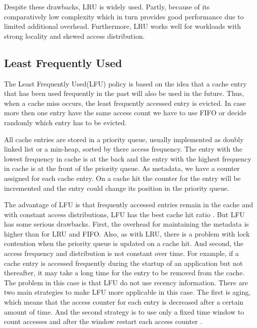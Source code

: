 \documentclass[
	12pt,
	a4paper,
	abstract,
	bibliography=totoc,
	chapterprefix,
	headings=openright,
	numbers=endperiod,
	parskip=half,
	twoside,
]{scrreprt}
\begin{document}
Despite these drawbacks, LRU is widely used.
Partly, because of its comparatively low complexity 
which in turn provides good performance due to limited additional overhead.
Furthermore, LRU works well for workloads with strong locality and skewed access distribution.

\subsection{Least Frequently Used}

The Least Frequently Used(LFU) policy is based on the idea that a cache entry that has been used frequently in the past will also be used in the future.
Thus, when a cache miss occurs, the least frequently accessed entry is evicted.
In case more then one entry have the same access count we have to use FIFO or decide randomly which entry has to be evicted.

All cache entries are stored in a priority queue, usually implemented as doubly linked list or a min-heap, sorted by there access frequency.
The entry with the lowest frequency in cache is at the back and the entry with the highest frequency in cache is at the front of the priority queue.
As metadata, we have a counter assigned for each cache entry.
On a cache hit the counter for the entry will be incremented and the entry could change its position in the priority queue.

The advantage of LFU is that frequently accessed entries remain in the cache and with constant
access distributions, LFU has the best cache hit ratio \cite{einziger2017tinylfu}.
But LFU has some  serious drawbacks.
First, the overhead for maintaining the metadata is higher than for LRU and FIFO.
Also, as with LRU, there is a problem with lock contention when the priority queue is updated on a cache hit.
And second, the access frequency and distribution is not constant over time.
For example, if a cache entry is accessed frequently during the startup of an application but not thereafter, it may take a long time for the 
entry to be removed from the cache.
The problem in this case is that LFU do not use recency information.
There are two main strategies to make LFU more applicable in this case.
The first is aging, which means that the access counter for each entry is decreased after  a certain amount of time.
And the second strategy is to use only a fixed time window to count accesses and after the window restart each access counter \cite{karakostas2000practical}.
\end{document}
